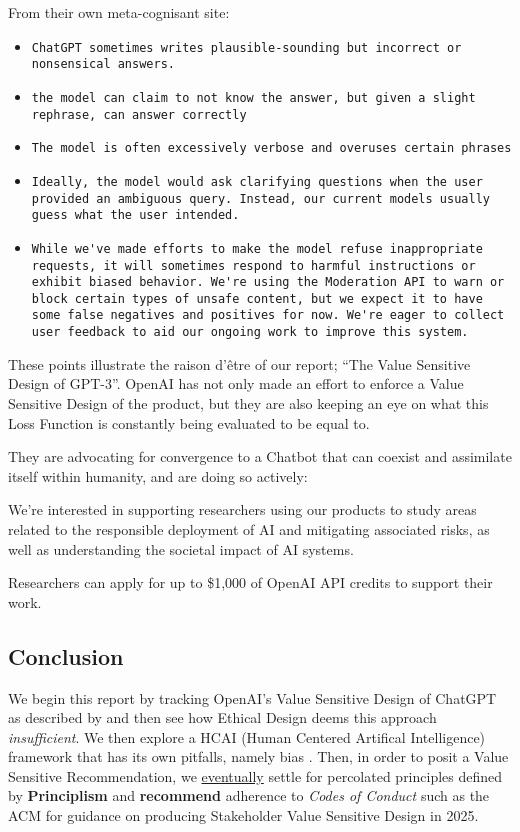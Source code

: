 From their own meta-cognisant site:

\begin{itemize}
\item \verb|ChatGPT sometimes writes plausible-sounding but incorrect or nonsensical answers.|
\item \verb|the model can claim to not know the answer, but given a slight rephrase, can answer correctly|
\item \verb|The model is often excessively verbose and overuses certain phrases|
\item \verb|Ideally, the model would ask clarifying questions when the user provided an ambiguous query. Instead, our current models usually guess what the user intended.|
\item \verb|While we've made efforts to make the model refuse inappropriate requests, it will sometimes respond to harmful instructions or exhibit biased behavior. We're using the Moderation API⁠ to warn or block certain types of unsafe content, but we expect it to have some false negatives and positives for now. We're eager to collect user feedback to aid our ongoing work to improve this system.|
\end{itemize}

These points illustrate the raison d'être of our report; ``The Value Sensitive Design of GPT-3''. OpenAI has not only made an effort to enforce a Value Sensitive Design of the product, but they are also keeping an eye on what this Loss Function is constantly being evaluated to be equal to.

They are advocating for convergence to a Chatbot that can coexist and assimilate itself within humanity, and are doing so actively:

\begin{spverbatim}
We're interested in supporting researchers using our products to study areas related to the responsible deployment of AI and mitigating associated risks, as well as understanding the societal impact of AI systems.

Researchers can apply for up to \$1,000 of OpenAI API credits to support their work.
\end{spverbatim}

\subsection{Conclusion}

We begin this report by tracking OpenAI's Value Sensitive Design of ChatGPT as described by \cite{Friedman1996} and then see how Ethical \parencite[]{Bennett2015} Design deems this approach \emph{insufficient}. We then explore a HCAI (Human Centered Artifical Intelligence) framework \parencite{Shneiderman2020} that has its own pitfalls, namely bias \parencite{Baeza2018}. Then, in order to posit a Value Sensitive Recommendation, we \hyperlink{section.6}{eventually} settle for percolated principles defined by \textbf{Principlism} and \textbf{recommend} adherence to \emph{Codes of Conduct} such as the ACM \parencite{acmcode2018} for guidance on producing Stakeholder Value Sensitive Design in 2025.

